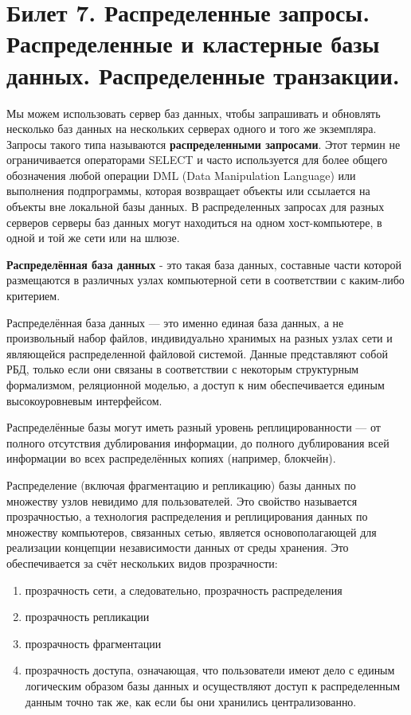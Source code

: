 \newpage
\section {Билет 7. Распределенные запросы. Распределенные и кластерные базы данных. Распределенные транзакции.}

Мы можем использовать сервер баз данных, чтобы запрашивать и обновлять несколько баз данных на нескольких серверах одного и того же экземпляра. Запросы такого типа называются \textbf{распределенными запросами}. Этот термин не ограничивается операторами SELECT и часто используется для более общего обозначения любой операции DML (Data Manipulation Language) или выполнения подпрограммы, которая возвращает объекты или ссылается на объекты вне локальной базы данных.
В распределенных запросах для разных серверов серверы баз данных могут находиться на одном хост-компьютере, в одной и той же сети или на шлюзе.

\bigskip
\textbf{Распределённая база данных} - это такая база данных, составные части которой размещаются в различных узлах компьютерной сети в соответствии с каким-либо критерием.

Распределённая база данных — это именно единая база данных, а не произвольный набор файлов, индивидуально хранимых на разных узлах сети и являющейся распределенной файловой системой. Данные представляют собой РБД, только если они связаны в соответствии с некоторым структурным формализмом, реляционной моделью, а доступ к ним обеспечивается единым высокоуровневым интерфейсом.

Распределённые базы могут иметь разный уровень реплицированности — от полного отсутствия дублирования информации, до полного дублирования всей информации во всех распределённых копиях (например, блокчейн).

Распределение (включая фрагментацию и репликацию) базы данных по множеству узлов невидимо для пользователей. Это свойство называется прозрачностью, а технология распределения и реплицирования данных по множеству компьютеров, связанных сетью, является основополагающей для реализации концепции независимости данных от среды хранения. Это обеспечивается за счёт нескольких видов прозрачности:

\begin{enumerate}
	\item[\textbullet] прозрачность сети, а следовательно, прозрачность распределения
	\item[\textbullet] прозрачность репликации
	\item[\textbullet] прозрачность фрагментации
	\item[\textbullet] прозрачность доступа, означающая, что пользователи имеют дело с единым логическим образом базы данных и осуществляют доступ к распределенным данным точно так же, как если бы они хранились централизованно.
\end{enumerate}

